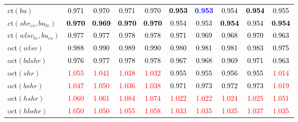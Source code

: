\begin{tabular}[t]{>{\centering\arraybackslash}m{2.5cm}ccccccccc}
ct$(bu)$ & \textcolor{black}{0.971} & \textcolor{black}{0.970} & \textcolor{black}{0.971} & \textcolor{black}{0.970} & \textcolor{black}{\textbf{0.953}} & \textcolor{blue}{\textbf{0.953}} & \textcolor{black}{0.954} & \textcolor{black}{\textbf{0.954}} & \textcolor{black}{0.955}\\
ct$(shr_{cs}, bu_{te})$ & \textcolor{black}{\textbf{0.970}} & \textcolor{black}{\textbf{0.969}} & \textcolor{black}{\textbf{0.970}} & \textcolor{black}{\textbf{0.970}} & \textcolor{black}{0.954} & \textcolor{black}{0.953} & \textcolor{black}{\textbf{0.954}} & \textcolor{black}{0.954} & \textcolor{black}{\textbf{0.954}}\\
ct$(wlsv_{te}, bu_{cs})$ & \textcolor{black}{0.977} & \textcolor{black}{0.977} & \textcolor{black}{0.978} & \textcolor{black}{0.978} & \textcolor{black}{0.971} & \textcolor{black}{0.969} & \textcolor{black}{0.968} & \textcolor{black}{0.970} & \textcolor{black}{0.963}\\
oct$(wlsv)$ & \textcolor{black}{0.988} & \textcolor{black}{0.990} & \textcolor{black}{0.989} & \textcolor{black}{0.990} & \textcolor{black}{0.980} & \textcolor{black}{0.981} & \textcolor{black}{0.981} & \textcolor{black}{0.983} & \textcolor{black}{0.975}\\
oct$(bdshr)$ & \textcolor{black}{0.976} & \textcolor{black}{0.977} & \textcolor{black}{0.978} & \textcolor{black}{0.978} & \textcolor{black}{0.967} & \textcolor{black}{0.968} & \textcolor{black}{0.969} & \textcolor{black}{0.971} & \textcolor{black}{0.963}\\
oct$(shr)$ & \textcolor{red}{1.055} & \textcolor{red}{1.041} & \textcolor{red}{1.038} & \textcolor{red}{1.032} & \textcolor{black}{0.955} & \textcolor{black}{0.955} & \textcolor{black}{0.956} & \textcolor{black}{0.955} & \textcolor{red}{1.014}\\
oct$(bshr)$ & \textcolor{red}{1.047} & \textcolor{red}{1.050} & \textcolor{red}{1.036} & \textcolor{red}{1.038} & \textcolor{black}{0.971} & \textcolor{black}{0.973} & \textcolor{black}{0.972} & \textcolor{black}{0.973} & \textcolor{red}{1.019}\\
oct$(hshr)$ & \textcolor{red}{1.060} & \textcolor{red}{1.061} & \textcolor{red}{1.084} & \textcolor{red}{1.074} & \textcolor{red}{1.022} & \textcolor{red}{1.022} & \textcolor{red}{1.024} & \textcolor{red}{1.025} & \textcolor{red}{1.051}\\
oct$(hbshr)$ & \textcolor{red}{1.050} & \textcolor{red}{1.050} & \textcolor{red}{1.055} & \textcolor{red}{1.058} & \textcolor{red}{1.033} & \textcolor{red}{1.035} & \textcolor{red}{1.035} & \textcolor{red}{1.037} & \textcolor{red}{1.035}\\

\end{tabular}
